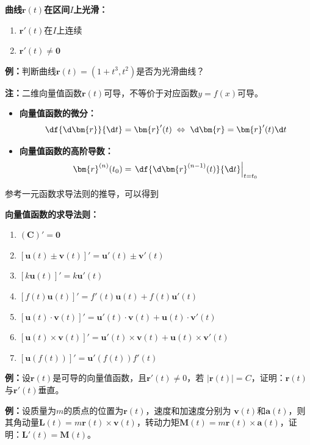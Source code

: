 \begin{thx}
	{\bf 曲线$\bm{r}(t)$在区间$I$上光滑：}
	\begin{enumerate}[(1)]
	  \item $\bm{r}'(t)$在$I$上连续
	  \item $\bm{r}'(t)\ne \bm{0}$
	\end{enumerate}
\end{thx}

{\bf 例：}判断曲线$\bm{r}(t)=(1+t^3,t^2)$是否为光滑曲线？

{\bf 注：}二维向量值函数$\bm{r}(t)$可导，不等价于对应函数$y=f(x)$可导。

\begin{thx}
	\begin{itemize}
	  \item {\bf 向量值函数的微分：}
	  $$\df{\d\bm{r}}{\d t}=\bm{r}'(t)\;\Leftrightarrow\;
	  \d\bm{r}=\bm{r}'(t)\d t$$
	  \item {\bf 向量值函数的高阶导数：}
	  $$\bm{r}^{(n)}(t_0)=\left.\df{\d\bm{r}^{(n-1)}(t)}{\d t}\right|_{t=t_0}$$
	\end{itemize}
\end{thx}

参考一元函数求导法则的推导，可以得到

\begin{thx}
	{\bf 向量值函数的求导法则：}
	\begin{enumerate} 
	  \item $(\bm{C})'=\bm{0}$ 
	  \item $[\bm{u}(t)\pm\bm{v}(t)]'=\bm{u}'(t)\pm\bm{v}'(t)$ 
	  \item $[k\bm{u}(t)]'=k\bm{u}'(t)$ 
	  \item $[f(t)\bm{u}(t)]'=f'(t)\bm{u}(t)+f(t)\bm{u}'(t)$ 
	  \item $[\bm{u}(t)\cdot\bm{v}(t)]'=\bm{u}'(t)\cdot\bm{v}(t)
	  +\bm{u}(t)\cdot\bm{v}'(t)$ 
	  \item $[\bm{u}(t)\times\bm{v}(t)]'=\bm{u}'(t)\times\bm{v}(t)
	  +\bm{u}(t)\times\bm{v}'(t)$
	  \item $[\bm{u}(f(t))]'=\bm{u}'(f(t))f'(t)$ 
	\end{enumerate}
\end{thx}

{\bf 例：}设$\bm{r}(t)$是可导的向量值函数，且$\bm{r}'(t)\ne 0$，若
$|\bm{r}(t)|=C$，证明：$\bm{r}(t)$与$\bm{r}'(t)$垂直。

{\bf 例：}设质量为$m$的质点的位置为$\bm{r}(t)$，速度和加速度分别为
$\bm{v}(t)$和$\bm{a}(t)$，则其角动量$\bm{L}(t)
=m\bm{r}(t)\times\bm{v}(t)$，转动力矩$\bm{M}(t)=m\bm{r}(t)
\times\bm{a}(t)$，证明：$\bm{L}'(t)=\bm{M}(t)$。

